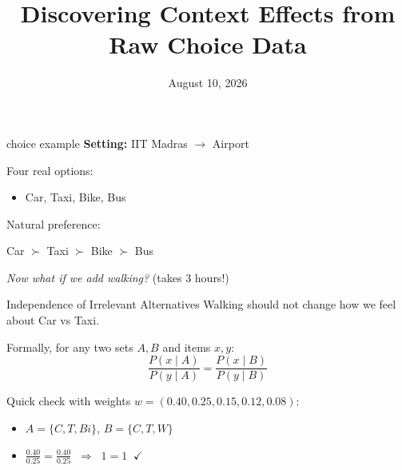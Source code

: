 \documentclass[aspectratio=169]{beamer}
\title{Discovering Context Effects from Raw Choice Data}
\subtitle{}
\author{}
\institute{}
\date{August 10, 2026}
\begin{document}
\begin{frame}
    \titlepage
\end{frame}

\begin{frame}{ choice example}
    \textbf{Setting:} IIT Madras $\rightarrow$ Airport

    \vspace{1em}

    Four real options:
    \begin{itemize}
        \item Car, Taxi, Bike, Bus
    \end{itemize}

    \vspace{0.5em}

    Natural preference:
    \begin{center}
        Car $\succ$ Taxi $\succ$ Bike $\succ$ Bus
    \end{center}

    \vspace{1em}

    \textit{Now what if we add walking?} \pause \hfill (takes 3 hours!)
\end{frame}
\begin{frame}{Independence of Irrelevant Alternatives}
    Walking should not change how we feel about Car vs Taxi.

    \vspace{0.5em}

    Formally, for any two sets $A, B$ and items $x, y$:
    \begin{equation*}
        \frac{P(x \mid A)}{P(y \mid A)} = \frac{P(x \mid B)}{P(y \mid B)}
    \end{equation*}

    \vspace{0.5em}

    Quick check with weights $w = (0.40, 0.25, 0.15, 0.12, 0.08)$:
    \begin{itemize}
        \item $A = \{C, T, Bi\}$, $B = \{C, T, W\}$
        \item $\frac{0.40}{0.25} = \frac{0.40}{0.25} \;\; \Rightarrow \;\; 1 = 1 \;\; \checkmark$
    \end{itemize}
\end{frame}
\end{document}
